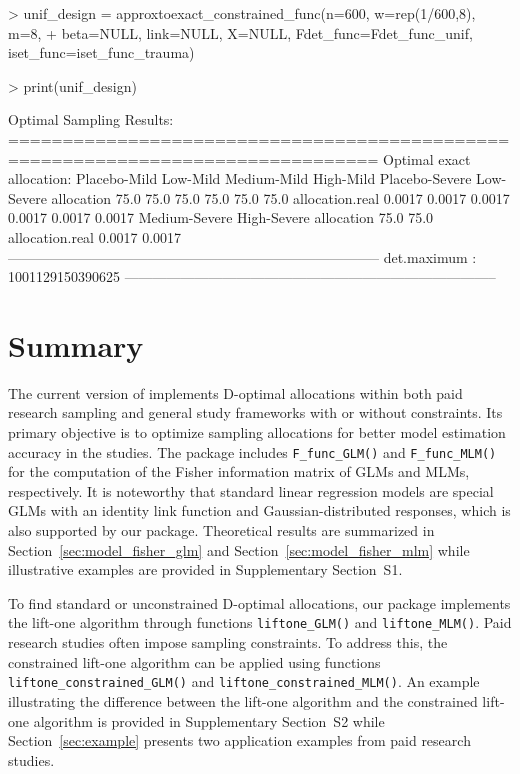 \begin{example}
  > unif_design = approxtoexact_constrained_func(n=600, w=rep(1/600,8), m=8,
  + beta=NULL, link=NULL, X=NULL, Fdet_func=Fdet_func_unif, iset_func=iset_func_trauma)

  > print(unif_design)

  Optimal Sampling Results:
  ================================================================================
  Optimal exact allocation:
  Placebo-Mild Low-Mild Medium-Mild High-Mild Placebo-Severe Low-Severe
  allocation      75.0         75.0     75.0        75.0      75.0           75.0
  allocation.real 0.0017       0.0017   0.0017      0.0017    0.0017         0.0017
  Medium-Severe High-Severe
  allocation      75.0          75.0
  allocation.real 0.0017        0.0017
  --------------------------------------------------------------------------------
  det.maximum :
  1001129150390625
  --------------------------------------------------------------------------------
\end{example}

\section{Summary}

The current version of  implements D-optimal allocations within both paid research sampling and general study frameworks with or without constraints. Its primary objective is to optimize sampling allocations for better model estimation accuracy in the studies. The package includes \texttt{F\_func\_GLM()} and \texttt{F\_func\_MLM()} for the computation of the Fisher information matrix of GLMs and MLMs, respectively. It is noteworthy that standard linear regression models are special GLMs with an identity link function and Gaussian-distributed responses, which is also supported by our package. Theoretical results are summarized in Section~\ref{sec:model_fisher_glm} and Section~\ref{sec:model_fisher_mlm} while illustrative examples are provided in Supplementary Section~S1.

To find standard or unconstrained D-optimal allocations, our package implements the lift-one algorithm through functions \texttt{liftone\_GLM()} and \texttt{liftone\_MLM()}. Paid research studies often impose sampling constraints. To address this, the constrained lift-one algorithm can be applied using functions \texttt{liftone\_constrained\_GLM()} and \texttt{liftone\_constrained\_MLM()}. An example illustrating the difference between the lift-one algorithm and the constrained lift-one algorithm is provided in Supplementary Section~S2 while Section~\ref{sec:example} presents two application examples from paid research studies.

